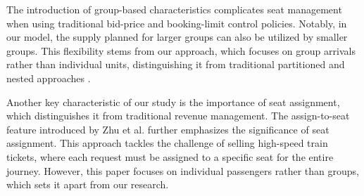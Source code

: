 
The introduction of group-based characteristics complicates seat management when using traditional bid-price and booking-limit control policies. Notably, in our model, the supply planned for larger groups can also be utilized by smaller groups. This flexibility stems from our approach, which focuses on group arrivals rather than individual units, distinguishing it from traditional partitioned and nested approaches \cite{curry1990optimal, van2008simulation}.




Another key characteristic of our study is the importance of seat assignment, which distinguishes it from traditional revenue management. The assign-to-seat feature introduced by Zhu et al. \cite{zhu2023assign} further emphasizes the significance of seat assignment. This approach tackles the challenge of selling high-speed train tickets, where each request must be assigned to a specific seat for the entire journey. However, this paper focuses on individual passengers rather than groups, which sets it apart from our research.








